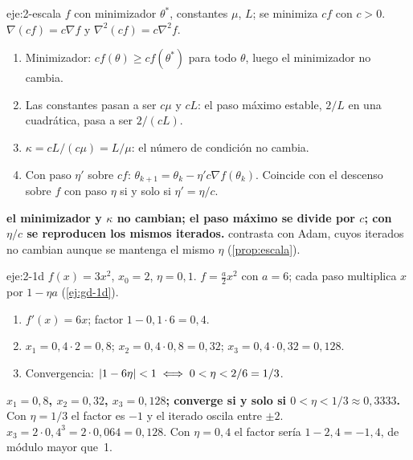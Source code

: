 \begin{solucion}{eje:2-escala}
\datos $f$ con minimizador $\theta^{\ast}$, constantes $\mu$, $L$; se minimiza $cf$ con $c>0$.
\planteamiento $\nabla(cf)=c\nabla f$ y $\nabla^{2}(cf)=c\nabla^{2}f$.
\pasos
\begin{enumerate}[label=\arabic*.]
  \item Minimizador: $cf(\theta)\ge cf(\theta^{\ast})$ para todo $\theta$, luego el minimizador no cambia.
  \item Las constantes pasan a ser $c\mu$ y $cL$: el paso máximo estable, $2/L$ en una cuadrática, pasa a ser $2/(cL)$.
  \item $\kappa=cL/(c\mu)=L/\mu$: el número de condición no cambia.
  \item Con paso $\eta'$ sobre $cf$: $\theta_{k+1}=\theta_k-\eta'c\nabla f(\theta_k)$. Coincide con el descenso sobre $f$ con paso $\eta$ si y solo si $\eta'=\eta/c$.
\end{enumerate}
\resultado \textbf{el minimizador y $\kappa$ no cambian; el paso máximo se divide por $c$; con $\eta/c$ se reproducen los mismos iterados.}
\comprobacion contrasta con Adam, cuyos iterados no cambian aunque se mantenga el mismo $\eta$ (\cref{prop:escala}).
\end{solucion}

\begin{solucion}{eje:2-1d}
\datos $f(x)=3x^{2}$, $x_0=2$, $\eta=0{,}1$.
\planteamiento $f=\frac{a}{2}x^{2}$ con $a=6$; cada paso multiplica $x$ por $1-\eta a$ (\cref{ej:gd-1d}).
\pasos
\begin{enumerate}[label=\arabic*.]
  \item $f'(x)=6x$; factor $1-0{,}1\cdot 6=0{,}4$.
  \item $x_1=0{,}4\cdot 2=0{,}8$; $x_2=0{,}4\cdot 0{,}8=0{,}32$; $x_3=0{,}4\cdot 0{,}32=0{,}128$.
  \item Convergencia: $\lvert1-6\eta\rvert<1\iff 0<\eta<2/6=1/3$.
\end{enumerate}
\resultado \textbf{$x_1=0{,}8$, $x_2=0{,}32$, $x_3=0{,}128$; converge si y solo si $0<\eta<1/3\approx 0{,}3333$.} Con $\eta=1/3$ el factor es $-1$ y el iterado oscila entre $\pm 2$.
\comprobacion $x_3=2\cdot 0{,}4^{3}=2\cdot 0{,}064=0{,}128$. Con $\eta=0{,}4$ el factor sería $1-2{,}4=-1{,}4$, de módulo mayor que~1.
\end{solucion}


